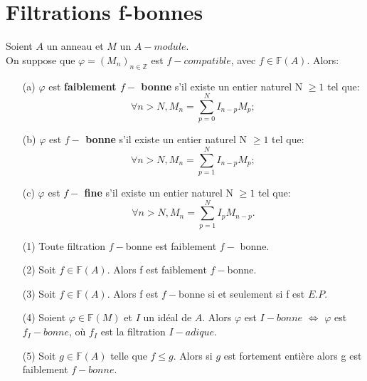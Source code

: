 \section{Filtrations f-bonnes}
\begin{madefinition}
	\label{maprop11}
	Soient $A$ un anneau et $M$ un $A-module$.\\
	On suppose que $\varphi=(M_n)_{n \in \mathbb{Z}}$ est $f-compatible$, avec $f \in \mathbb{F}(A)$. Alors:
	\begin{itemize}
		\item[(a)] $\varphi$ est \textbf{faiblement $f-$ bonne} s'il existe un entier naturel N $\geqslant 1$ tel que:
		\[\forall n > N, M_{n}=\sum_{p=0}^{N}I_{n-p}M_{p}; \]
		\item[(b)] $\varphi$ est \textbf{$f-$ bonne} s'il existe un entier naturel N $\geqslant 1$ tel que:
		\[\forall n > N, M_{n}=\sum_{p=1}^{N}I_{n-p}M_{p}; \]
		\item[(c)] $\varphi$ est \textbf{$f-$ fine} s'il existe un entier naturel N $\geqslant 1$ tel que:
		\[\forall n > N, M_{n}=\sum_{p=1}^{N}I_{p}M_{n-p}. \]
	\end{itemize} 
\end{madefinition}
\begin{maremarque}
	\label{maprop6}
	\begin{enumerate}
		\item[(1)] Toute filtration $f-$bonne est faiblement $f-$ bonne.
		\item[(2)] Soit $f \in \mathbb{F}(A)$. Alors f est faiblement $f-$bonne.
		\item[(3)] Soit $f \in \mathbb{F}(A)$. Alors f est $f-$bonne si et seulement si f est $E.P.$
		\item[(4)] Soient $\varphi \in \mathbb{F}(M)$ et $I$ un idéal de $A$. Alors $\varphi$ est $I-bonne$ $\Longleftrightarrow$ $\varphi$ est $f_{I}-bonne$, où $f_{I}$ est la filtration $I-adique$.
		\item[(5)] Soit $g \in \mathbb{F}(A)$ telle que $f \leqslant g$. Alors si $g$ est fortement entière alors g est faiblement $f-bonne$.
	\end{enumerate}
\end{maremarque}
